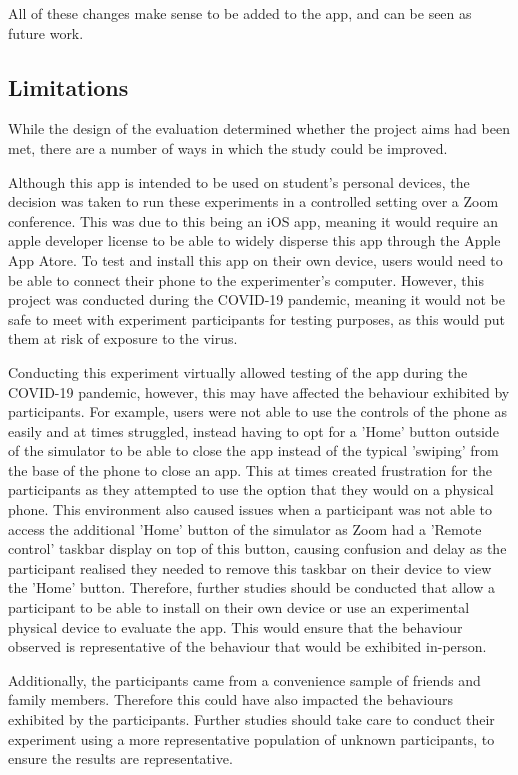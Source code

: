 \documentclass{l4proj}
\begin{document}
All of these changes make sense to be added to the app, and can be seen as future work.


\subsection{Limitations}

While the design of the evaluation determined whether the project aims had been met, there are a number of ways in which the study could be improved.

Although this app is intended to be used on student's personal devices, the decision was taken to run these experiments in a controlled setting over a Zoom conference. This was due to this being an iOS app, meaning it would require an apple developer license to be able to widely disperse this app through the Apple App Atore. To test and install this app on their own device, users would need to be able to connect their phone to the experimenter's computer. However, this project was conducted during the COVID-19 pandemic, meaning it would not be safe to meet with experiment participants for testing purposes, as this would put them at risk of exposure to the virus. 

Conducting this experiment virtually allowed testing of the app during the COVID-19 pandemic, however, this may have affected the behaviour exhibited by participants. For example, users were not able to use the controls of the phone as easily and at times struggled, instead having to opt for a 'Home' button outside of the simulator to be able to close the app instead of the typical 'swiping' from the base of the phone to close an app. This at times created frustration for the participants as they attempted to use the option that they would on a physical phone. This environment also caused issues when a participant was not able to access the additional 'Home' button of the simulator as Zoom had a 'Remote control' taskbar display on top of this button, causing confusion and delay as the participant realised they needed to remove this taskbar on their device to view the 'Home' button. Therefore, further studies should be conducted that allow a participant to be able to install on their own device or use an experimental physical device to evaluate the app. This would ensure that the behaviour observed is representative of the behaviour that would be exhibited in-person.

Additionally, the participants came from a convenience sample of friends and family members. Therefore this could have also impacted the behaviours exhibited by the participants. Further studies should take care to conduct their experiment using a more representative population of unknown participants, to ensure the results are representative.
\end{document}

